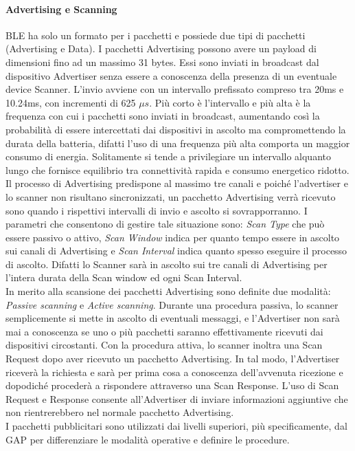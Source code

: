 \paragraph{Advertising e Scanning}
BLE ha solo un formato per i pacchetti e possiede due tipi di pacchetti (Advertising e Data). 
I pacchetti Advertising possono avere un payload di dimensioni fino ad un massimo 31 bytes. Essi sono inviati in broadcast dal dispositivo Advertiser senza essere a conoscenza della presenza di un eventuale device Scanner. L'invio avviene con un intervallo prefissato compreso tra 20ms e 10.24ms, con incrementi di 625 $\mu s$. Più corto è l'intervallo e più alta è la frequenza con cui i pacchetti sono inviati in broadcast, aumentando così la probabilità di essere intercettati dai dispositivi in ascolto ma compromettendo la durata della batteria, difatti l'uso di una frequenza più alta comporta un maggior consumo di energia. Solitamente si tende a privilegiare un intervallo alquanto lungo che fornisce equilibrio tra connettività rapida e consumo energetico ridotto.\\
Il processo di Advertising predispone al massimo tre canali e poiché l'advertiser e lo scanner non risultano sincronizzati, un pacchetto Advertising verrà ricevuto sono quando i rispettivi intervalli di invio e ascolto si sovrapporranno. I parametri che consentono di gestire tale situazione sono: \textit{Scan Type} che può essere passivo o attivo, \textit{Scan Window} indica per quanto tempo essere in ascolto sui canali di Advertising e \textit{Scan Interval} indica quanto spesso eseguire il processo di ascolto. Difatti lo Scanner sarà in ascolto sui tre canali di Advertising per l'intera durata della Scan window ed ogni Scan Interval.\\ 
In merito alla scansione dei pacchetti Advertising sono definite due modalità: \textit{Passive scanning} e \textit{Active scanning}.
Durante una procedura passiva, lo scanner semplicemente si mette in ascolto di eventuali messaggi, e l'Advertiser non sarà mai a conoscenza se uno o più pacchetti saranno effettivamente ricevuti dai dispositivi circostanti.
Con la procedura attiva, lo scanner inoltra una Scan Request dopo aver ricevuto un pacchetto Advertising. In tal modo, l'Advertiser riceverà la richiesta e sarà per prima cosa a conoscenza dell'avvenuta ricezione e dopodiché procederà a rispondere attraverso una Scan Response. L'uso di Scan Request e Response consente all'Advertiser di inviare informazioni aggiuntive che non rientrerebbero nel normale pacchetto Advertising. \\
I pacchetti pubblicitari sono utilizzati dai livelli superiori, più specificamente, dal GAP per differenziare le modalità operative e definire le procedure.

